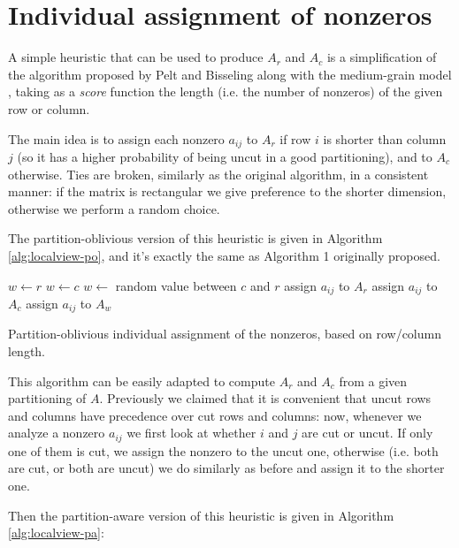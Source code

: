 \section{Individual assignment of nonzeros} \label{sec:localview}

A simple heuristic that can be used to produce $A_r$ and $A_c$ is a simplification of the algorithm proposed by Pelt and Bisseling along with the medium-grain model \cite[Alg.~1]{mediumgrain}, taking as a \emph{score} function the length (i.e. the number of nonzeros) of the given row or column.

The main idea is to assign each nonzero $a_{ij}$ to $A_r$ if row $i$ is shorter than column $j$ (so it has a higher probability of being uncut in a good partitioning), and to $A_c$ otherwise. Ties are broken, similarly as the original algorithm, in a consistent manner: if the matrix is rectangular we give preference to the shorter dimension, otherwise we perform a random choice.

The partition-oblivious version of this heuristic is given in Algorithm \ref{alg:localview-po}, and it's exactly the same as Algorithm 1 originally proposed.

\begin{algorithm}[h]
	\begin{algorithmic}
		\State
		\State $w \gets r$ 
		\State $w \gets c$
		\Else
		\State $w \gets$ random value between $c$ and $r$
		\EndIf
		\State assign $a_{ij}$ to $A_r$
		\State assign $a_{ij}$ to $A_c$
		\Else
		\State assign $a_{ij}$ to $A_w$
		\EndIf
		\EndFor
	\end{algorithmic}
	\caption{Partition-oblivious individual assignment of the nonzeros, based on row/column length.} \label{alg:localview-po}
\end{algorithm}

This algorithm can be easily adapted to compute $A_r$ and $A_c$ from a given partitioning of $A$. Previously we claimed that it is convenient that uncut rows and columns have precedence over cut rows and columns: now, whenever we analyze a nonzero $a_{ij}$ we first look at whether $i$ and $j$ are cut or uncut. If only one of them is cut, we assign the nonzero to the uncut one, otherwise (i.e. both are cut, or both are uncut) we do similarly as before and assign it to the shorter one.

Then the partition-aware version of this heuristic is given in Algorithm \ref{alg:localview-pa}:

